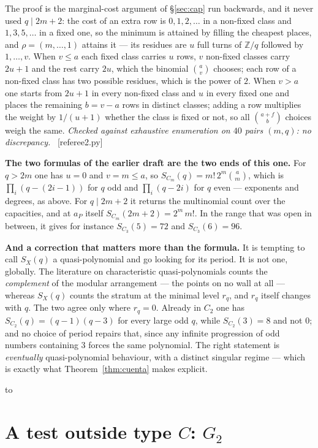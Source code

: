 \documentclass[11pt,a4paper]{article}
\theoremstyle{definition}
\newcommand{\ZZ}{\mathbb{Z}}
\newcommand{\ver}[1]{\unskip\penalty0\ \textcolor{azul}{\small\textsf{[#1]}}}
\newenvironment{keybox}
  {\par\vspace{9pt}\begin{lrbox}{\fichabox}%
   \begin{minipage}{0.90\textwidth}\vspace{7pt}\setlength{\parskip}{3pt}}
  {\vspace{7pt}\end{minipage}\end{lrbox}%
   \par\noindent\hbox to \textwidth{\hfill
   \textcolor{azul}{\rule[-\dp\fichabox]{3.2pt}{\dimexpr\ht\fichabox+\dp\fichabox\relax}}%
   \colorbox{fondoficha}{\usebox{\fichabox}}\hfill}%
   \par\vspace{9pt}}
\begin{document}
\noindent The proof is the marginal-cost argument of \S\ref{sec:cap} run backwards, and it never
used $q\mid 2m+2$: the cost of an extra row is $0,1,2,\dots$ in a non-fixed class and $1,3,5,\dots$
in a fixed one, so the minimum is attained by filling the cheapest places, and $\rho=(m,\dots,1)$
attains it --- its residues are $u$ full turns of $\ZZ/q$ followed by $1,\dots,v$. When $v\le a$
each fixed class carries $u$ rows, $v$ non-fixed classes carry $2u+1$ and the rest carry $2u$,
which the binomial $\binom{a}{v}$ chooses; each row of a non-fixed class has two possible residues,
which is the power of $2$. When $v>a$ one starts from $2u+1$ in every non-fixed class and $u$ in
every fixed one and places the remaining $b=v-a$ rows in distinct classes; adding a row multiplies
the weight by $1/(u+1)$ whether the class is fixed or not, so all $\binom{a+f}{b}$ choices weigh the
same. \emph{Checked against exhaustive enumeration on $40$ pairs $(m,q)$: no discrepancy.}
\ver{referee2.py}

\noindent \textbf{The two formulas of the earlier draft are the two ends of this one.} For $q>2m$
one has $u=0$ and $v=m\le a$, so $S_{C_m}(q)=m!\,2^m\binom{a}{m}$, which is
$\prod_i(q-(2i-1))$ for $q$ odd and $\prod_i(q-2i)$ for $q$ even --- exponents and degrees, as
above. For $q\mid 2m+2$ it returns the multinomial count over the capacities, and at $a_P$ itself
$S_{C_m}(2m+2)=2^m\,m!$. In the range that was open in between, it gives for instance
$S_{C_3}(5)=72$ and $S_{C_3}(6)=96$.

\begin{keybox}
\textbf{And a correction that matters more than the formula.} It is tempting to call $S_X(q)$ a
quasi-polynomial and go looking for its period. It is not one, globally. The literature on
characteristic quasi-polynomials counts the \emph{complement} of the modular arrangement --- the
points on no wall at all --- whereas $S_X(q)$ counts the stratum at the minimal level $r_q$, and
$r_q$ itself changes with $q$. The two agree only where $r_q=0$. Already in $C_2$ one has
$S_{C_2}(q)=(q-1)(q-3)$ for every large odd $q$, while $S_{C_2}(3)=8$ and not $0$; and no choice of
period repairs that, since any infinite progression of odd numbers containing $3$ forces the same
polynomial. The right statement is \emph{eventually} quasi-polynomial behaviour, with a distinct
singular regime --- which is exactly what Theorem~\ref{thm:cuenta} makes explicit.
\end{keybox}

\section{A test outside type $C$: $G_2$}\label{sec:g2}
\end{document}
